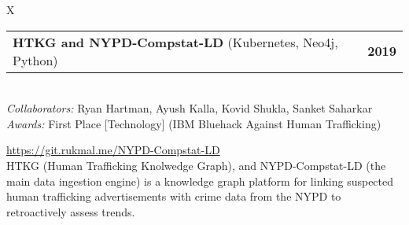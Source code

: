 \documentclass[10pt]{article}
\newcommand{\tabularxwidth}{\textwidth}
\begin{document}
        \begin{tabularx}{\tabularxwidth}{X}
                {
                    \begin{tabularx}{\tabularxwidth}{@{}X r}
                        \textbf{HTKG and NYPD-Compstat-LD}
                            (Kubernetes, Neo4j, Python)
                        &
                        \textbf{
        2019} \\
                    \end{tabularx}
                } \\

            
                \textit{Collaborators:} Ryan Hartman, Ayush Kalla, Kovid Shukla, Sanket Saharkar \\
            

            
                    \textit{Awards:}
                First Place [Technology] (IBM Bluehack Against Human Trafficking)

            
                \url{https://git.rukmal.me/NYPD-Compstat-LD} \\
            

            
    HTKG (Human Trafficking Knolwedge Graph), and NYPD-Compstat-LD (the main data ingestion engine) is a knowledge graph platform for linking suspected human trafficking advertisements with crime data from the NYPD to retroactively assess trends. \\

        \end{tabularx}

        
            \vspace{.5em}
        

    
\end{document}

